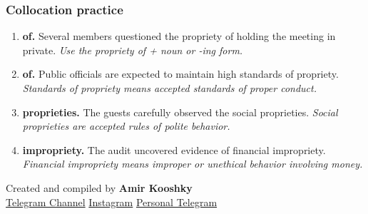 \documentclass[11pt]{article}
\begin{document}
\subsubsection{Collocation practice}
\begin{enumerate}
  \item \textbf{of.} Several members questioned the propriety of holding the meeting in private. \emph{Use the propriety of + noun or -ing form.}
  \item \textbf{of.} Public officials are expected to maintain high standards of propriety. \emph{Standards of propriety means accepted standards of proper conduct.}
  \item \textbf{proprieties.} The guests carefully observed the social proprieties. \emph{Social proprieties are accepted rules of polite behavior.}
  \item \textbf{impropriety.} The audit uncovered evidence of financial impropriety. \emph{Financial impropriety means improper or unethical behavior involving money.}
\end{enumerate}

\vfill
\begin{center}
\small\color{Muted} Created and compiled by \textbf{Amir Kooshky}\\
\href{https://t.me/KooshkyTOEFL}{Telegram Channel}\quad\textbullet\quad
\href{https://www.instagram.com/kooshkytoefl}{Instagram}\quad\textbullet\quad
\href{https://t.me/KooshkyTOEFL\_pv}{Personal Telegram}
\end{center}
\end{document}
